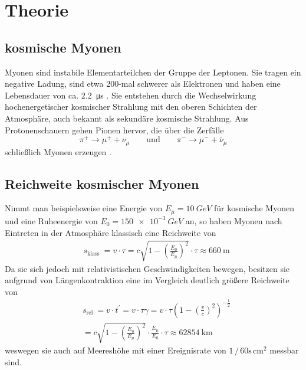 \section{Theorie}
\label{sec:Theorie}

\subsection{kosmische Myonen}
\label{subsec:kosmische Myonen}

Myonen sind instabile Elementarteilchen der Gruppe der Leptonen. 
Sie tragen ein negative Ladung, sind etwa 200-mal schwerer als Elektronen 
und haben eine Lebensdauer von ca. \qty{2,2}{\micro\second} \cite[125]{grupen}.
Sie entstehen durch die Wechselwirkung hochenergetischer kosmischer Strahlung
mit den oberen Schichten der Atmosphäre,
auch bekannt als sekundäre kosmische Strahlung.
Aus Protonenschauern gehen Pionen hervor,
die über die Zerfälle
\begin{equation*}
    \pi^{+} \rightarrow \mu^{+}+\nu_\mu \qquad \text {und} \qquad \pi^{-} \rightarrow \mu^{-}+\bar{\nu}_\mu
\end{equation*}
schließlich Myonen erzeugen \cite{demtroeder4}.


\subsection{Reichweite kosmischer Myonen}
\label{subsec:Reichweite kosmischer Myonen}

Nimmt man beispielsweise eine Energie von $E_\mu = \qty{10}{GeV}$ für kosmische Myonen 
und eine Ruheenergie von $E_0 = \qty{150e-3}{GeV}$ an,
so haben Myonen nach Eintreten in der Atmosphäre klassisch eine Reichweite von
\begin{equation}
    \begin{aligned}
    & s_{\text {klass }}=v \cdot \tau=c \sqrt{1-\left(\frac{E_0}{E_\mu}\right)^2} \cdot \tau \approx 660 \mathrm{~m}
    \end{aligned}
\end{equation}
Da sie sich jedoch mit relativistischen Geschwindigkeiten bewegen,
besitzen sie aufgrund von Längenkontraktion eine im Vergleich deutlich größere Reichweite von 
\begin{equation}
    \begin{aligned}
    & s_{\text {rel }}=v \cdot t^{\prime}=v \cdot \tau \gamma=v \cdot \tau\left(1-\left(\frac{v}{c}\right)^2\right)^{-\frac{1}{2}} \\
    & =c \sqrt{1-\left(\frac{E_0}{E_\mu}\right)^2} \cdot \frac{E_\mu}{E_0} \cdot \tau \approx 62854 \mathrm{~km} 
    \end{aligned}
\end{equation}
weswegen sie auch auf Meereshöhe mit einer Ereignisrate von $1 \, / \, 60\text{s} \, \text{cm}^2$ \cite[208]{grupen} messbar sind.


